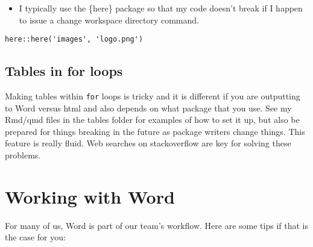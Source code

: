 \documentclass[
  letterpaper,
  oneside]{scrbook}
\providecommand{\tightlist}{%
  \setlength{\itemsep}{0pt}\setlength{\parskip}{0pt}}\usepackage{longtable,booktabs,array}
\begin{document}
\begin{itemize}
\tightlist
\item
  I typically use the \{here\} package so that my code doesn't break if
  I happen to issue a change workspace directory command.
\end{itemize}

\begin{verbatim}
here::here('images', 'logo.png')
\end{verbatim}

\hypertarget{tables-in-for-loops}{%
\subsection{Tables in for loops}\label{tables-in-for-loops}}

Making tables within \texttt{for} loops is tricky and it is different if
you are outputting to Word versus html and also depends on what package
that you use. See my Rmd/qmd files in the tables folder for examples of
how to set it up, but also be prepared for things breaking in the future
as package writers change things. This feature is really fluid. Web
searches on stackoverflow are key for solving these problems.

\hypertarget{working-with-word}{%
\section{Working with Word}\label{working-with-word}}

For many of us, Word is part of our team's workflow. Here are some tips
if that is the case for you:
\end{document}
